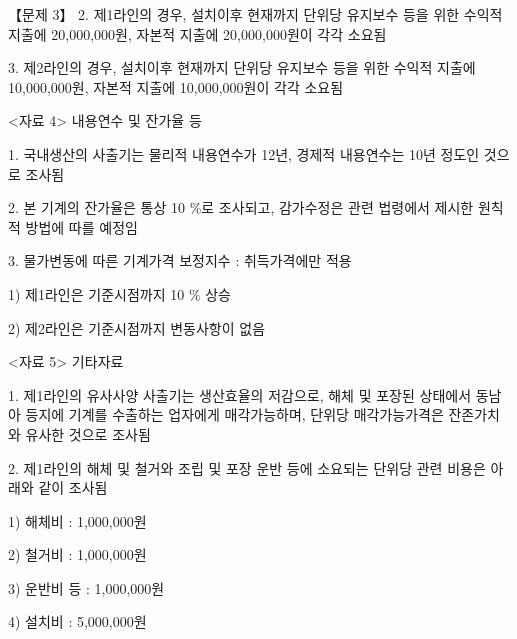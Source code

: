 \begin{longquestion}{【문제 3】}
2. 제1라인의 경우, 설치이후 현재까지 단위당 유지보수 등을 위한 수익적 지출에 20,000,000원, 자본적 지출에 20,000,000원이 각각 소요됨 \par
3. 제2라인의 경우, 설치이후 현재까지 단위당 유지보수 등을 위한 수익적 지출에 10,000,000원, 자본적 지출에 10,000,000원이 각각 소요됨 \par
<자료 4> 내용연수 및 잔가율 등 \par
1. 국내생산의 사출기는 물리적 내용연수가 12년, 경제적 내용연수는 10년 정도인 것으로 조사됨 \par
2. 본 기계의 잔가율은 통상 10 \%로 조사되고, 감가수정은 관련 법령에서 제시한 원칙적 방법에 따를 예정임 \par
3. 물가변동에 따른 기계가격 보정지수 : 취득가격에만 적용 \par
1) 제1라인은 기준시점까지 10 \% 상승 \par
2) 제2라인은 기준시점까지 변동사항이 없음 \par
<자료 5> 기타자료 \par
1. 제1라인의 유사사양 사출기는 생산효율의 저감으로, 해체 및 포장된 상태에서 동남아 등지에 기계를 수출하는 업자에게 매각가능하며, 단위당 매각가능가격은 잔존가치와 유사한 것으로 조사됨 \par
2. 제1라인의 해체 및 철거와 조립 및 포장 운반 등에 소요되는 단위당 관련 비용은 아래와 같이 조사됨 \par
1) 해체비 : 1,000,000원 \par
2) 철거비 : 1,000,000원 \par
3) 운반비 등 : 1,000,000원 \par
4) 설치비 : 5,000,000원 \par
\end{longquestion}
